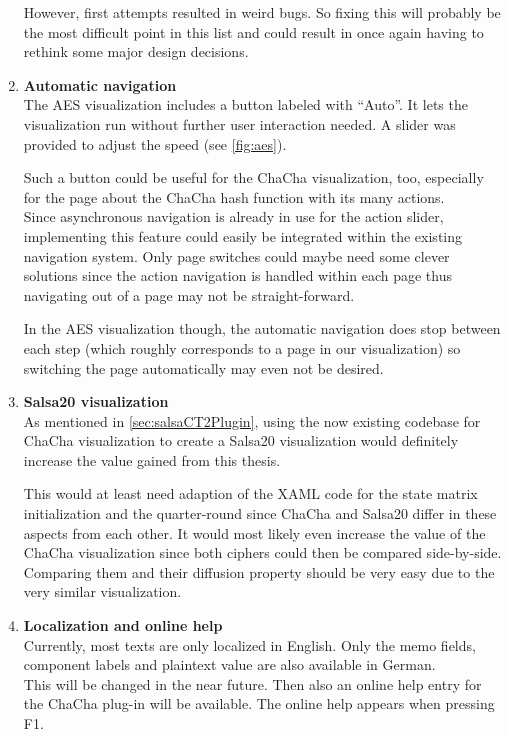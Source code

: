 \begin{enumerate}[wide, labelwidth=!, labelindent=0pt]
However, first attempts resulted in weird bugs. So fixing this will probably be the most difficult point in this list and could result in once again having to rethink some major design decisions.

\item \textbf{Automatic navigation}\\
The AES visualization includes a button labeled with ``Auto''. It lets the visualization run without further user interaction needed. A slider was provided to adjust the speed (see \autoref{fig:aes}). 

Such a button could be useful for the ChaCha visualization, too, especially for the page about the ChaCha hash function with its many actions.\\
Since asynchronous navigation is already in use for the action slider, implementing this feature could easily be integrated within the existing navigation system. Only page switches could maybe need some clever solutions since the action navigation is handled within each page thus navigating out of a page may not be straight-forward. 

In the AES visualization though, the automatic navigation does stop between each step (which roughly corresponds to a page in our visualization) so switching the page automatically may even not be desired.

\vfill
\pagebreak

\item \textbf{Salsa20 visualization}\\
As mentioned in \autoref{sec:salsaCT2Plugin}, using the now existing codebase for ChaCha visualization to create a Salsa20 visualization would definitely increase the value gained from this thesis.

This would at least need adaption of the XAML code for the state matrix initialization and the quarter-round since ChaCha and Salsa20 differ in these aspects from each other. It would most likely even increase the value of the ChaCha visualization since both ciphers could then be compared side-by-side. Comparing them and their diffusion property should be very easy due to the very similar visualization.

\item \textbf{Localization and online help}\\
Currently, most texts are only localized in English. Only the memo fields, component labels and plaintext value are also available in German.\\
This will be changed in the near future. Then also an online help entry for the ChaCha plug-in will be available. The online help appears when pressing F1.

\end{enumerate}

